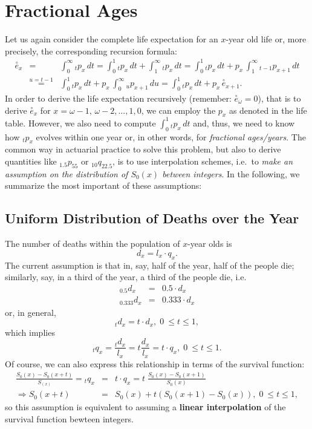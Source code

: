 \documentclass[11pt,fleqn,oneside]{book}
\begin{document}
\section{Fractional Ages}
\label{SECFRACAGES}
Let us again consider the complete life expectation for an $x$-year old life or, more precisely, the corresponding recursion formula:
\begin{eqnarray*}
\stackrel{\circ}{e}_{x} &=& \int_0^{\infty} {_tp_x}\,dt = \int_0^{1} {_tp_x}\,dt +\int_1^{\infty} {_tp_x}\,dt 
= \int_0^{1} {_tp_x}\,dt +p_x\,\int_1^{\infty} {_{t-1}p_{x+1}}\,dt \\
&\stackrel{u=t-1}{=}& \int_0^{1} {_tp_x}\,dt +p_x\,\int_0^{\infty} {_{u}p_{x+1}}\,du 
=  \int_0^{1} {_tp_x}\,dt +p_x\,\stackrel{\circ}{e}_{x+1}.
\end{eqnarray*}
In order to derive the life expectation recursively (remember: $\stackrel{\circ}{e}_{\omega}=0$), that is to derive $\stackrel{\circ}{e}_{x}$ for $x=\omega-1,\,\omega-2,...,1,0$, we can employ the $p_x$ as denoted in the life table. However, we also need to compute $\int_0^{1} {_tp_x}\,dt$ and, thus, we need to know how $_tp_x$ evolves within one year or, in other words, for \textit{fractional ages/years}. The common way in actuarial practice to solve this problem, but also to derive quantities like ${_{1.5}p_{55}}$ or ${_{10}q_{22.5}}$, is to use interpolation schemes, i.e.\ to \textit{make an assumption on the distribution of $S_0(x)$ between integers}. In the following, we summarize the most important of these assumptions:

\subsection*{Uniform Distribution of Deaths over the Year}
The number of deaths within the population of $x$-year olds is 
$$
d_x = l_x \cdot q_x.
$$
The current assumption is that in, say, half of the year, half of the people die; similarly, say, in a third of the year, a third of the people die, i.e.\
\begin{eqnarray*}
{_{0.5}d_x} &=& 0.5\cdot d_x \\
{_{0.333}d_x} &=& 0.333 \cdot d_x 
\end{eqnarray*}
or, in general, 
$$
{_{t}d_x} =  t\cdot d_x, \;0\ \leq t \leq 1,
$$
which implies
$$
{_tq_x} = \frac{_td_x}{l_x} = t \frac{d_x}{l_x} = t\cdot q_x, \;0\ \leq t \leq 1.
$$
Of course, we can also express this relationship in terms of the survival function:
\begin{eqnarray*}
 \frac{S_0(x) - S_0(x+t)}{S_(x)} = {_tq_x} &=& t\cdot q_x =  t\;\frac{S_0(x) - S_0(x+1)}{S_0(x)} \\
 \Rightarrow S_0(x+t) &=& S_0(x) + t \left(S_0(x+1) - S_0(x)\right), \;0\ \leq t \leq 1,
\end{eqnarray*}
so this assumption is equivalent to assuming a \textbf{linear interpolation} of the survival function bewteen integers.
\end{document}
